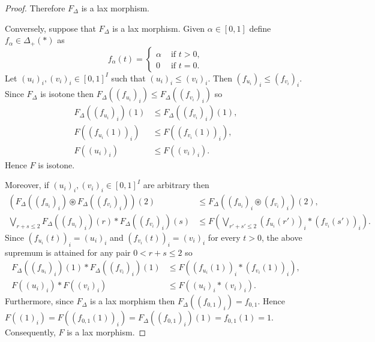 \documentclass[10pt,a4paper]{amsart}
\begin{document}
\begin{proof}
		Therefore $F_\Delta$ is a lax morphism.
		
		
		Conversely, suppose that $F_\Delta$ is a lax morphism. Given $\alpha\in [0,1]$ define $f_\alpha\in\Delta_+(\ast)$ as
		$$f_\alpha(t)=\begin{cases}\alpha&\text{ if }t>0,\\
			0&\text{ if }t=0.\end{cases}$$
		Let $(u_i)_i,(v_i)_i\in [0,1]^I$ such that $(u_i)_i\leq (v_i)_i$. Then $(f_{u_i})_i\leq (f_{v_i})_i.$ Since $F_\Delta$ is isotone then $F_\Delta((f_{u_i})_i)\leq F_\Delta((f_{v_i})_i)$ so \begin{align*}
			F_\Delta((f_{u_i})_i)(1)&\leq F_\Delta((f_{v_i})_i)(1),\\
			F((f_{u_i}(1))_i)&\leq	F((f_{v_i}(1))_i),\\
			F((u_i)_i)&\leq F((v_i)_i).
		\end{align*}
		Hence $F$ is isotone.
		
		Moreover, if $(u_i)_i,(v_i)_i\in [0,1]^I$ are arbitrary then 
		\begin{align*}
			(F_\Delta((f_{u_i})_i)\circledast F_\Delta((f_{v_i})_i))(2)&\leq F_\Delta((f_{u_i})_i\circledast(f_{v_i})_i )(2),\\
			\bigvee_{r+s\leq 2} F_\Delta((f_{u_i})_i)(r)\ast  F_\Delta((f_{v_i})_i)(s)&\leq F\left(\bigvee_{r'+s'\leq 2} (f_{u_i}(r'))_i\ast (f_{v_i}(s'))_i\right).
		\end{align*}
		Since $(f_{u_i}(t))_i=(u_i)_i$ and $(f_{v_i}(t))_i=(v_i)_i$ for every $t>0$, the above supremum is attained for any pair $0<r+s\leq 2$ so 
		\begin{align*}
			F_\Delta((f_{u_i})_i)(1)\ast  F_\Delta((f_{v_i})_i)(1)&\leq F((f_{u_i}(1))_i\ast (f_{v_i}(1))_i),\\
			F((u_i)_i)\ast F((v_i)_i)&\leq F((u_i)_i\ast (v_i)_i).
		\end{align*}
		Furthermore, since $F_\Delta$ is a lax morphism then $F_\Delta((f_{0,1})_i)=f_{0,1}.$ Hence $F((1)_i)=F((f_{0,1}(1))_i)=F_\Delta((f_{0,1})_i)(1)=f_{0,1}(1)=1$. Consequently, $F$ is a lax morphism.
		

\end{proof}
\end{document}
